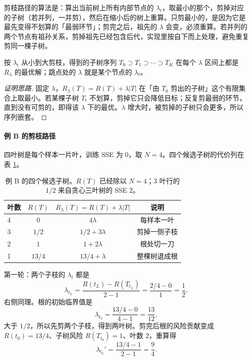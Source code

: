 \documentclass[11pt,a4paper,fontset=windows,zihao=-4]{ctexart}
\newcommand{\tabhead}{\sffamily\bfseries\color{navy}}
\begin{document}
剪枝路径的算法是：算出当前树上所有内部节点的 $\lambda_t$，取最小的那个，剪掉对应的子树（若并列，一并剪），然后在缩小后的树上重算。只剪最小的，是因为它是最先变得不划算的「最弱环节」；剪完之后，祖先的 $\lambda$ 会变，必须重算。若并列的两个节点有祖孙关系，剪掉祖先已经包含后代，实现里按自下而上处理，避免重复剪同一棵子树。

\begin{prop}[最弱环节给出嵌套的子树序列]
按 $\lambda_t$ 从小到大剪枝，得到的子树序列 $T_0\supset T_1\supset\cdots\supset T_K$ 在每个 $\lambda$ 区间上都是 $R_\lambda$ 的最优解；跳点处的 $\lambda$ 就是某个节点的 $\lambda_t$。
\end{prop}

\begin{proof}[证明思路]
固定 $\lambda$，$R_\lambda(T)=R(T)+\lambda\lvert T\rvert$ 在「由 $T_0$ 剪出的子树」这个有限集合上取最小。若某棵子树 $T_t$ 不划算，剪掉它只会降低目标；反复剪最弱的环节，直到没有可剪的，即得该 $\lambda$ 下的最优。$\lambda$ 增大时，被剪掉的子树只会更多，所以序列嵌套。
\end{proof}

\paragraph{例 B 的剪枝路径} 四叶树是每个样本一片叶，训练 SSE 为 $0$，取 $N=4$。四个候选子树的代价列在表 \ref{tab:prunecost}。

\begin{table}[htbp]
\centering
\small
\begin{tabular}{@{}lccc@{}}
\toprule
\rowcolor{navy!7}
\tabhead 叶数 & \tabhead $R(T)$ & \tabhead $R_\lambda(T)=R(T)+\lambda\lvert T\rvert$ & \tabhead 说明\\
\midrule
4 & $0$ & $4\lambda$ & 每样本一叶\\
3 & $1/2$ & $1/2+3\lambda$ & 剪掉一侧子枝\\
2 & $1$ & $1+2\lambda$ & 根处切一刀\\
1 & $13/4$ & $13/4+\lambda$ & 整棵树退成根\\
\bottomrule
\end{tabular}
\caption{例 B 的四个候选子树。$R(T)$ 已经除以 $N=4$；$3$ 叶行的 $1/2$ 来自贪心三叶树的 SSE $2$。}
\label{tab:prunecost}
\end{table}

第一轮：两个子枝的 $\lambda_t$ 都是
\[
  \lambda_{t_L}=\frac{R(t_L)-R(T_{t_L})}{2-1}
  =\frac{2/4-0}{1}=\frac12,
\]
右侧同理。根的初始临界值是
\[
  \lambda_{t_0}=\frac{13/4-0}{4-1}=\frac{13}{12},
\]
大于 $1/2$，所以先剪两个子枝，得到两叶树。剪完后根的风险贡献变成 $R(t_0)=13/4$、子树风险 $R(T_{t_0})=1$、叶数 $2$，重算得
\[
  \lambda_{t_0}'=\frac{13/4-1}{2-1}=\frac94 .
\]
\end{document}
